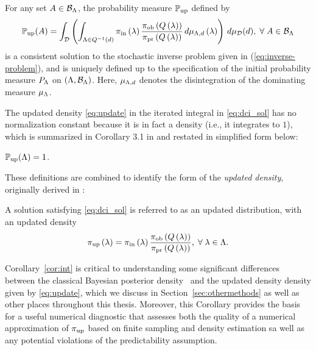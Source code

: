 \begin{thm}
  For any set $A\in \mathcal{B}_{{\Lambda}}$, the probability measure $\operatorname*{\mathbb{P}_{up}}$ defined by
  \begin{equation}\label{eq:dci_sol}
    \operatorname*{\mathbb{P}_{up}} (A) = \int_{\mathcal{D}} \left (  \int_{{\Lambda} \in Q^{-1}(d)}  \operatorname*{\pi_{in}}\left ( \lambda \right ) \frac{\operatorname*{\pi_{ob}}\left ( Q\left ( \lambda \right ) \right )}{\operatorname*{\pi_{pr}}\left ( Q\left ( \lambda \right ) \right )} \, d\mu_{{\Lambda}, d} \left ( \lambda \right ) \right ) \, d\mu_{\mathcal{D}}(d), \; \forall \; A \in \mathcal{B}_{{\Lambda}}
  \end{equation}
  is a consistent solution to the stochastic inverse problem given in (\ref{eq:inverse-problem}), and is uniquely defined up to the specification of the initial probability measure $P_{\Lambda}$ on $({\Lambda}, \mathcal{B}_{{\Lambda}})$.
  Here, $\mu_{{\Lambda}, d}$ denotes the disintegration of the dominating measure $\mu_{\Lambda}$.
\end{thm}

The updated density \eqref{eq:update} in the iterated integral in \eqref{eq:dci_sol} has no normalization constant because it is in fact a density (i.e., it integrates to $1$), which is summarized in Corollary 3.1 in \cite{BJW18} and restated in simplified form below:
\begin{cor}\label{cor:int}
$\operatorname*{\mathbb{P}_{up}}({\Lambda}) = 1$.
\end{cor}

These definitions are combined to identify the form of the \emph{updated density}, originally derived in \cite{BJW18}:

\begin{defn}\label{defn:updated}
  A solution satisfying \eqref{eq:dci_sol} is referred to as an updated distribution, with an updated density
  \begin{equation}\label{eq:update}
    \operatorname*{\pi_{up}} \left ( \lambda \right ) = \operatorname*{\pi_{in}} \left ( \lambda \right ) \frac{\operatorname*{\pi_{ob}} \left ( Q\left ( \lambda \right ) \right ) }{\operatorname*{\pi_{pr}} \left ( Q\left ( \lambda \right ) \right ) }, \; \forall \; \lambda \in {\Lambda}.
  \end{equation}
\end{defn}

Corollary~\ref{cor:int} is critical to understanding some significant differences between the classical Bayesian posterior density~\cite{Smith} and the updated density density given by \eqref{eq:update}, which we discuss in Section~\ref{sec:othermethods} as well as other places throughout this thesis.
Moreover, this Corollary provides the basis for a useful numerical diagnostic that assesses both the quality of a numerical approximation of $\operatorname*{\pi_{up}}$ based on finite sampling and density estimation sa well as any potential violations of the predictability assumption.

